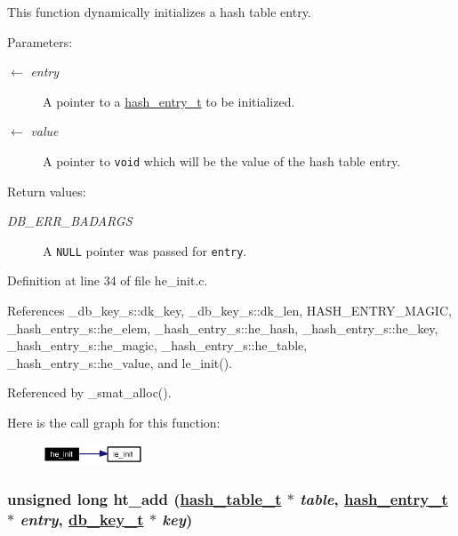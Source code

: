 This function dynamically initializes a hash table entry.

\begin{Desc}
\item[Parameters:]
\begin{description}
\item[\mbox{$\leftarrow$} {\em entry}]A pointer to a \hyperlink{group__dbprim__hash_ga2}{hash\_\-entry\_\-t} to be initialized. \item[\mbox{$\leftarrow$} {\em value}]A pointer to {\tt void} which will be the value of the hash table entry.\end{description}
\end{Desc}
\begin{Desc}
\item[Return values:]
\begin{description}
\item[{\em DB\_\-ERR\_\-BADARGS}]A {\tt NULL} pointer was passed for {\tt entry}.\end{description}
\end{Desc}


Definition at line 34 of file he\_\-init.c.

References \_\-db\_\-key\_\-s::dk\_\-key, \_\-db\_\-key\_\-s::dk\_\-len, HASH\_\-ENTRY\_\-MAGIC, \_\-hash\_\-entry\_\-s::he\_\-elem, \_\-hash\_\-entry\_\-s::he\_\-hash, \_\-hash\_\-entry\_\-s::he\_\-key, \_\-hash\_\-entry\_\-s::he\_\-magic, \_\-hash\_\-entry\_\-s::he\_\-table, \_\-hash\_\-entry\_\-s::he\_\-value, and le\_\-init().

Referenced by \_\-smat\_\-alloc().

Here is the call graph for this function:\begin{figure}[H]
\begin{center}
\leavevmode
\includegraphics[width=85pt]{group__dbprim__hash_ga19_cgraph}
\end{center}
\end{figure}
\hypertarget{group__dbprim__hash_ga11}{
\subsubsection[ht\_\-add]{\setlength{\rightskip}{0pt plus 5cm}unsigned long ht\_\-add (\hyperlink{struct__hash__table__s}{hash\_\-table\_\-t} $\ast$ {\em table}, \hyperlink{struct__hash__entry__s}{hash\_\-entry\_\-t} $\ast$ {\em entry}, \hyperlink{struct__db__key__s}{db\_\-key\_\-t} $\ast$ {\em key})}}
\label{group__dbprim__hash_ga11}



